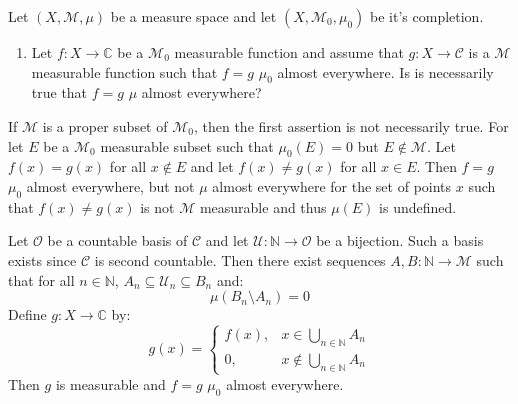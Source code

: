 \documentclass[crop=false,class=article]{standalone}                           %
\begin{document}
        \begin{problem}
            Let $(X,\mathcal{M},\mu)$ be a measure space and let
            $(X,\mathcal{M}_{0},\mu_{0})$ be it's completion.
            \begin{enumerate}
                \item   Let $f:X\rightarrow\mathbb{C}$ be a $\mathcal{M}_{0}$
                        measurable function and assume that
                        $g:X\rightarrow\mathcal{C}$ is a $\mathcal{M}$
                        measurable function such that $f=g$ $\mu_{0}$ almost
                        everywhere. Is is necessarily true that $f=g$ $\mu$
                        almost everywhere?
            \end{enumerate}
        \end{problem}
        \begin{solution}
            If $\mathcal{M}$ is a proper subset of $\mathcal{M}_{0}$, then the
            first assertion is not necessarily true. For let $E$ be a
            $\mathcal{M}_{0}$ measurable subset such that $\mu_{0}(E)=0$ but
            $E\notin\mathcal{M}$. Let $f(x)=g(x)$ for all $x\notin{E}$ and let
            $f(x)\ne{g}(x)$ for all $x\in{E}$. Then $f=g$ $\mu_{0}$ almost
            everywhere, but not $\mu$ almost everywhere for the set of
            points $x$ such that $f(x)\ne{g}(x)$ is not $\mathcal{M}$ measurable
            and thus $\mu(E)$ is undefined.
            \par\hfill\par
            Let $\mathcal{O}$ be a countable basis of $\mathcal{C}$ and let
            $\mathcal{U}:\mathbb{N}\rightarrow\mathcal{O}$ be a bijection. Such
            a basis exists since $\mathcal{C}$ is second countable. Then there
            exist sequences $A,B:\mathbb{N}\rightarrow\mathcal{M}$ such that
            for all $n\in\mathbb{N}$,
            $A_{n}\subseteq\mathcal{U}_{n}\subseteq{B}_{n}$ and:
            \begin{equation}
                \mu(B_{n}\setminus{A}_{n})=0
            \end{equation}
            Define $g:X\rightarrow\mathbb{C}$ by:
            \begin{equation}
                g(x)=
                \begin{cases}
                    f(x),&x\in\bigcup_{n\in\mathbb{N}}A_{n}\\
                    0,&x\notin\bigcup_{n\in\mathbb{N}}A_{n}
                \end{cases}
            \end{equation}
            Then $g$ is measurable and $f=g$ $\mu_{0}$ almost everywhere.
        \end{solution}
\end{document}
